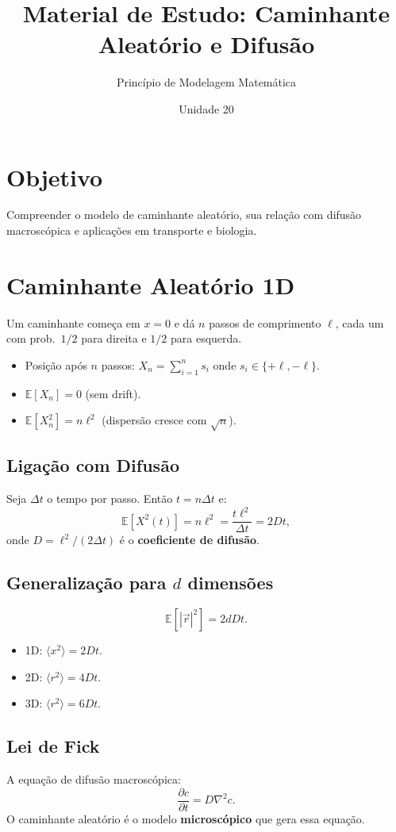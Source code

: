 \documentclass[12pt,a4paper]{article}
\title{Material de Estudo: Caminhante Aleat\'orio e Difus\~ao}
\author{Princ\'ipio de Modelagem Matem\'atica}
\date{Unidade 20}
\begin{document}
\maketitle

\section*{Objetivo}
Compreender o modelo de caminhante aleat\'orio, sua rela\c{c}\~ao com difus\~ao macrosc\'opica e aplica\c{c}\~oes em transporte e biologia.

\section*{Caminhante Aleat\'orio 1D}

Um caminhante come\c{c}a em $x=0$ e d\'a $n$ passos de comprimento $\ell$, cada um com prob.\ $1/2$ para direita e $1/2$ para esquerda.
\begin{itemize}
  \item Posi\c{c}\~ao ap\'os $n$ passos: $X_n = \sum_{i=1}^n s_i$ onde $s_i \in \{+\ell, -\ell\}$.
  \item $\mathbb{E}[X_n] = 0$ (sem drift).
  \item $\mathbb{E}[X_n^2] = n\ell^2$ (dispers\~ao cresce com $\sqrt{n}$).
\end{itemize}

\subsection*{Liga\c{c}\~ao com Difus\~ao}
Seja $\Delta t$ o tempo por passo. Ent\~ao $t = n\Delta t$ e:
\[
\mathbb{E}[X^2(t)] = n\ell^2 = \frac{t\ell^2}{\Delta t} = 2Dt,
\]
onde $D = \ell^2/(2\Delta t)$ \'e o \textbf{coeficiente de difus\~ao}.

\subsection*{Generaliza\c{c}\~ao para $d$ dimens\~oes}
\[
\mathbb{E}[|\vec{r}|^2] = 2dDt.
\]
\begin{itemize}
  \item 1D: $\langle x^2 \rangle = 2Dt$.
  \item 2D: $\langle r^2 \rangle = 4Dt$.
  \item 3D: $\langle r^2 \rangle = 6Dt$.
\end{itemize}

\subsection*{Lei de Fick}
A equa\c{c}\~ao de difus\~ao macrosc\'opica:
\[
\frac{\partial c}{\partial t} = D\nabla^2 c.
\]
O caminhante aleat\'orio \'e o modelo \textbf{microsc\'opico} que gera essa equa\c{c}\~ao.
\end{document}
